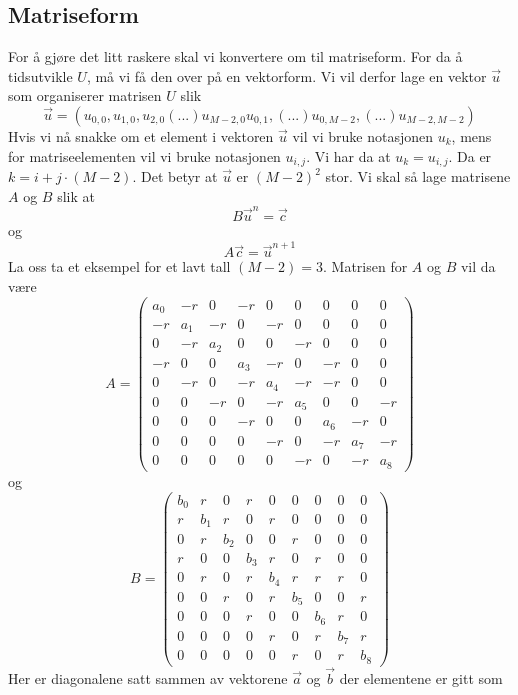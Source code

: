 \documentclass[reprint,english,notitlepage]{revtex4-2}  %
\begin{document}
\subsection{Matriseform}
For å gjøre det litt raskere skal vi konvertere om til matriseform. For da å tidsutvikle $U$, må vi få den over på en vektorform. Vi vil derfor lage en vektor $\vec{u}$ som organiserer matrisen $U$ slik
$$
\vec{u}=(u_{0,0}, u_{1,0}, u_{2,0} (...) u_{M-2, 0} u_{0,1},(...) u_{0, M-2}, (...) u_{M-2, M-2})
$$
Hvis vi nå snakke om et element i vektoren $\vec{u}$ vil vi bruke notasjonen $u_k$, mens for matriseelementen vil vi bruke notasjonen $u_{i,j}$. Vi har da at $u_k=u_{i,j}$. Da er $k=i+j\cdot (M-2)$. Det betyr at $\vec{u}$ er $(M-2)^2$ stor.
\newline 
Vi skal så lage matrisene $A$ og $B$ slik at
$$
B\vec{u}^n=\vec{c}
$$
og
$$
A\vec{c}=\vec{u}^{n+1}
$$
La oss ta et eksempel for et lavt tall $(M-2)=3$. Matrisen for $A$ og $B$ vil da være
\begin{equation}\label{eq:A}
	A=\begin{pmatrix}
		a_0 & -r & 0 & -r & 0 &0&0&0&0 \\
		-r & a_1 & -r & 0 & -r& 0&0&0&0 \\
		0 &-r &a_2&0&0&-r&0&0&0 \\
		-r &0&0&a_3&-r&0&-r&0&0 \\
		0&-r&0&-r&a_4&-r&-r&0&0 \\
		0&0&-r&0&-r&a_5&0&0&-r \\
		0&0&0&-r&0&0&a_6&-r&0 \\
		0&0&0&0&-r&0&-r&a_7&-r \\
		0&0&0&0&0&-r&0&-r&a_8
		\end{pmatrix}
\end{equation}
og
\begin{equation}\label{eq:B}
B=\begin{pmatrix}
	b_0 & r & 0 & r & 0 &0&0&0&0 \\
	r & b_1 & r & 0 & r& 0&0&0&0 \\
	0 &r &b_2&0&0&r&0&0&0 \\
	r &0&0&b_3&r&0&r&0&0 \\
	0&r&0&r&b_4&r&r&r&0 \\
	0&0&r&0&r&b_5&0&0&r \\
	0&0&0&r&0&0&b_6&r&0 \\
	0&0&0&0&r&0&r&b_7&r \\
	0&0&0&0&0&r&0&r&b_8
\end{pmatrix}
\end{equation}
Her er diagonalene satt sammen av vektorene $\vec{a}$ og $\vec{b}$ der elementene er gitt som
\end{document}
